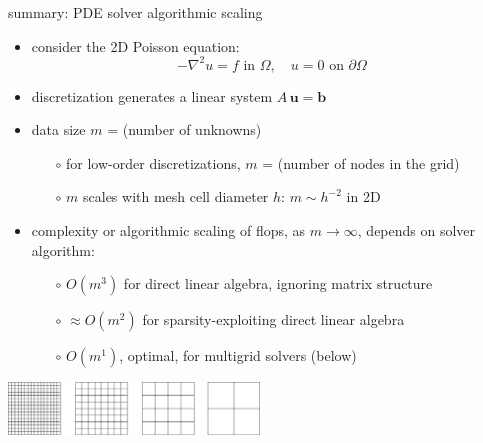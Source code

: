 \documentclass[svgnames,
               hyperref={colorlinks,citecolor=DeepPink4,linkcolor=FireBrick,urlcolor=Maroon},
               usepdftitle=false]  %
               {beamer}
\newcommand{\grad}{\nabla}
\newcommand{\bb}{\mathbf{b}}
\newcommand{\bu}{\mathbf{u}}
\begin{document}
\begin{frame}{summary: PDE solver algorithmic scaling}

\begin{itemize}
\item consider the 2D Poisson equation:
    $$-\grad^2 u = f \text{ in $\Omega$}, \quad u=0 \text{ on $\partial\Omega$}$$
\item discretization generates a linear system $A\,\bu = \bb$
\item data size $m$ = (number of unknowns)
    \begin{itemize}
    \item[$\circ$] for low-order discretizations, $m$ = (number of nodes in the grid)
    \item[$\circ$] $m$ scales with mesh cell diameter $h$: \quad $m \sim h^{-2}$ in 2D
    \end{itemize}
\item \alert{complexity} or \alert{algorithmic scaling} of flops, as $m\to\infty$, depends on solver algorithm:
    \begin{itemize}
    \item[$\circ$] $O(m^3)$ for direct linear algebra, ignoring matrix structure
    \item[$\circ$] $\approx O(m^2)$ for sparsity-exploiting direct linear algebra
    \item[$\circ$] $O(m^1)$, \alert{optimal}, for \alert{multigrid} solvers (below)
    \end{itemize}
\end{itemize}

\medskip
\begin{center}
\includegraphics[width=0.5\textwidth]{images/multigrid-grids.png}
\end{center}
\end{frame}
\end{document}
